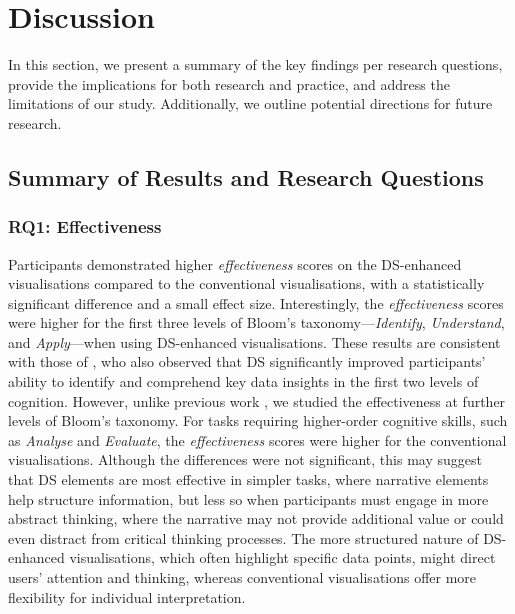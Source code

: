 \section{Discussion}
In this section, we present a summary of the key findings per research questions, provide the implications for both research and practice, and address the limitations of our study. Additionally, we outline potential directions for future research.

\subsection{Summary of Results and Research Questions}
\subsubsection{RQ1: Effectiveness} Participants demonstrated higher \textit{effectiveness} scores on the DS-enhanced visualisations compared to the conventional visualisations, with a statistically significant difference and a small effect size. Interestingly, the \textit{effectiveness} scores were higher for the first three levels of Bloom's taxonomy—\textit{Identify}, \textit{Understand}, and \textit{Apply}—when using DS-enhanced visualisations. These results are consistent with those of \citet{shao2024datastorytelling}, who also observed that DS significantly improved participants' ability to identify and comprehend key data insights in the first two levels of cognition. However, unlike previous work \cite{shao2024datastorytelling, zdanovic2022influence}, we studied the effectiveness at further levels of Bloom's taxonomy. For tasks requiring higher-order cognitive skills, such as \textit{Analyse} and \textit{Evaluate}, the \textit{effectiveness} scores were higher for the conventional visualisations. Although the differences were not significant, this may suggest that DS elements are most effective in simpler tasks, where narrative elements help structure information, but less so when participants must engage in more abstract thinking, where the narrative may not provide additional value or could even distract from critical thinking processes. The more structured nature of DS-enhanced visualisations, which often highlight specific data points, might direct users' attention and thinking, whereas conventional visualisations offer more flexibility for individual interpretation. 


